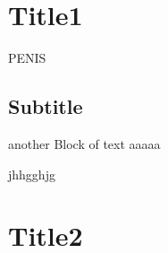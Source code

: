 
\section{Title1}
PENIS

\subsection{Subtitle}
another Block of text
aaaaa

jhhgghjg

\section{Title2}
